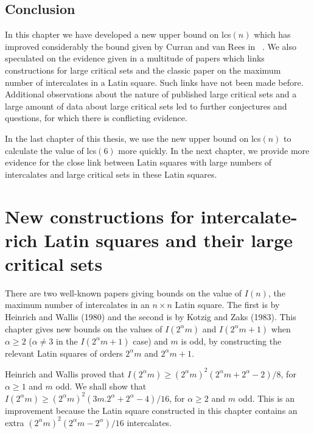 \documentclass[12pt]{report}
\def\lcs#1{{\rm lcs}$(#1)$}
\begin{document}

\section{Conclusion}
In this chapter we have developed a new upper bound on \lcs{n} which has improved
considerably the bound given by Curran and van Rees in ~\cite{MR80j:05022}.
We also speculated on the evidence given in a multitude of papers which
links constructions for large critical sets and the classic paper on
the maximum number of intercalates in a Latin square.  Such links have
not been made before.  Additional observations about the nature of
published large critical sets and a large amount of data about large
critical sets led to further conjectures and questions, for which there
is conflicting evidence.

In the last chapter of this thesis, we use the new upper bound on \lcs{n}
to calculate the value of \lcs{6} more quickly.  In the next chapter,
we provide more evidence for the close link between Latin squares with
large numbers of intercalates and large critical sets in these Latin 
squares.

\chapter{New constructions for intercalate-rich Latin squares and their large critical sets}\label{ch5}

There are two well-known papers giving bounds on the value of $I(n)$,
the maximum number of intercalates in an $n \times n$ Latin square.
The first is by Heinrich and Wallis \cite{MR84g:05034} (1980) and the
second is by Kotzig and Zaks \cite{MR85h:05026} (1983).  This chapter
gives new bounds on the values of $I(2^\alpha m)$ and $I(2^\alpha m +
1)$ when $\alpha \geq 2$ ($\alpha \neq 3$ in the $I(2^\alpha m + 1)$
case) and $m$ is odd, by constructing the relevant Latin squares of orders
$2^\alpha m$ and $2^\alpha m + 1$.

Heinrich and Wallis proved that $I(2^\alpha m) \geq (2^\alpha m)^2 
(2^\alpha m+2^\alpha - 2)/8$, for $\alpha \geq 1$ and $m$ odd.
We shall show that $I(2^\alpha m) \geq (2^\alpha m)^2
(3m.2^\alpha + 2^\alpha - 4)/16$, for $\alpha \geq 2$ and $m$ odd.
This is an improvement because the Latin square constructed in this chapter
contains an extra 
$(2^\alpha m)^2 (2^\alpha m - 2^\alpha)/16$ intercalates.
\end{document}
